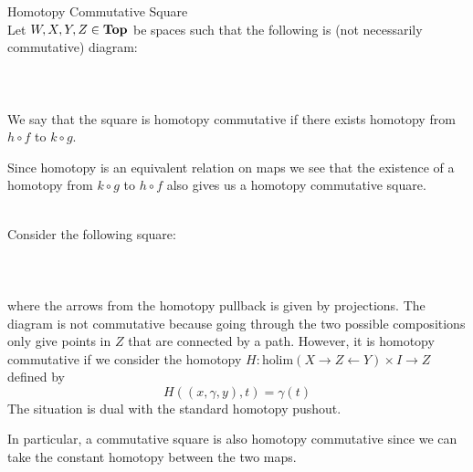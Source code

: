 \documentclass[a4paper]{article}
\begin{document}
\begin{defn}{Homotopy Commutative Square}{}\\
Let $W,X,Y,Z\in\bold{Top}$ be spaces such that the following is (not necessarily commutative) diagram:  
 \\~\\  \\~\\
We say that the square is homotopy commutative if there exists homotopy from $h\circ f$ to $k\circ g$. 
\end{defn}

Since homotopy is an equivalent relation on maps we see that the existence of a homotopy from $k\circ g$ to $h\circ f$ also gives us a homotopy commutative square. 

\begin{eg}{}{}\\
Consider the following square:  
 \\~\\  \\~\\
where the arrows from the homotopy pullback is given by projections. The diagram is not commutative because going through the two possible compositions only give points in $Z$ that are connected by a path. However, it is homotopy commutative if we consider the homotopy $H:\text{holim}(X\rightarrow Z\leftarrow Y)\times I\to Z$ defined by $$H((x,\gamma,y),t)=\gamma(t)$$ The situation is dual with the standard homotopy pushout. 
\end{eg}

In particular, a commutative square is also homotopy commutative since we can take the constant homotopy between the two maps. 
\end{document}
